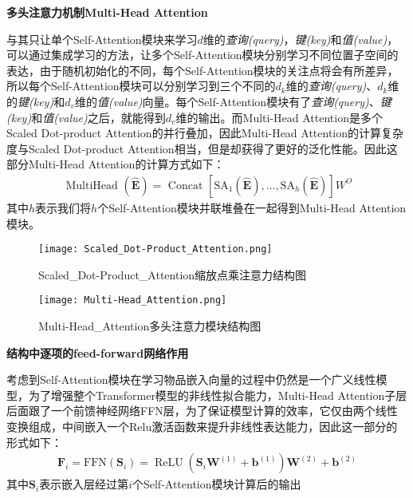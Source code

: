 \textbf{多头注意力机制Multi-Head Attention}

与其只让单个Self-Attention模块来学习$d$维的\textit{查询(query)}，\textit{键(key)}和\textit{值(value)}，可以通过集成学习的方法，让多个Self-Attention模块分别学习不同位置子空间的表达，由于随机初始化的不同，每个Self-Attention模块的关注点将会有所差异，所以每个Self-Attention模块可以分别学习到三个不同的$d_{k}$维的\textit{查询(query)}、$d_{k}$维的\textit{键(key)}和$d_{v}$维的\textit{值(value)}向量。每个Self-Attention模块有了\textit{查询(query)}、\textit{键(key)}和\textit{值(value)}之后，就能得到$d_{v}$维的输出。而Multi-Head Attention是多个Scaled Dot-product Attention的并行叠加，因此Multi-Head Attention的计算复杂度与Scaled Dot-product Attention相当，但是却获得了更好的泛化性能。因此这部分Multi-Head Attention的计算方式如下：
\begin{align} 
	\text { MultiHead }(\widehat{\mathbf{E}}) =\text { Concat }[\mathrm{SA}_{1}(\widehat{\mathbf{E}}), \ldots, \mathrm{SA}_{h}(\widehat{\mathbf{E}})] W^{O}
\end{align}
其中$h$表示我们将$h$个Self-Attention模块并联堆叠在一起得到Multi-Head Attention模块。

\begin{figure}[!htb]
   \begin{minipage}{0.48\textwidth}
     \centering
     \texttt{[image: Scaled\_Dot-Product\_Attention.png]} %
     \caption{Scaled\_Dot-Product\_Attention缩放点乘注意力结构图}
     \label{Fig:Scaled_Dot-Product_Attention}
   \end{minipage}\hfill
   \begin {minipage}{0.48\textwidth}
     \centering
     \texttt{[image: Multi-Head\_Attention.png]} %
     \caption{Multi-Head\_Attention多头注意力模块结构图}
     \label{Fig:Multi-Head_Attention}
   \end{minipage}
\end{figure}

\textbf{结构中逐项的feed-forward网络作用}

考虑到Self-Attention模块在学习物品嵌入向量的过程中仍然是一个广义线性模型，为了增强整个Transformer模型的非线性拟合能力，Multi-Head Attention子层后面跟了一个前馈神经网络FFN层，为了保证模型计算的效率，它仅由两个线性变换组成，中间嵌入一个Relu激活函数来提升非线性表达能力，因此这一部分的形式如下：
\begin{align}
	\mathbf{F}_{i}=\mathrm{FFN}\left(\mathbf{S}_{i}\right)=\operatorname{ReLU}\left(\mathbf{S}_{i} \mathbf{W}^{(1)}+\mathbf{b}^{(1)}\right) \mathbf{W}^{(2)}+\mathbf{b}^{(2)}
\end{align}
其中$\mathbf{S}_{i}$表示嵌入层经过第$i$个Self-Attention模块计算后的输出

